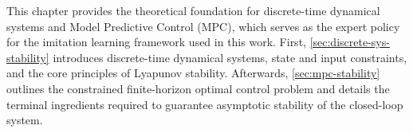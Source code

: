 This chapter provides the theoretical foundation for discrete-time dynamical systems and Model Predictive Control (MPC), 
which serves as the expert policy for the imitation learning framework used in this work. First, \cref{sec:discrete-sys-stability} 
introduces discrete-time dynamical systems, state and input constraints, and the core principles of Lyapunov stability. 
Afterwards, \cref{sec:mpc-stability} outlines the constrained finite-horizon optimal control problem and details the 
terminal ingredients required to guarantee asymptotic stability of the closed-loop system.
